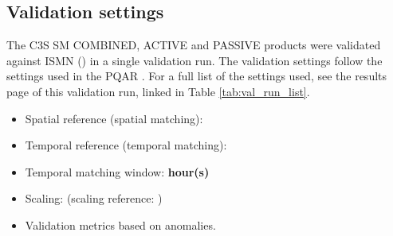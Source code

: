 \def\runidx{\detokenize{$<ContentVars['report_run_index']>$}}

\subsection{Validation settings} \label{ssec:settings}

The \ac{C3S} SM COMBINED, ACTIVE and PASSIVE products were validated against \ac{ISMN} () in a single validation run.
The validation settings follow the settings used in the \ac{PQAR} \citep{c3spqar}.
For a full list of the settings used, see the results page of this validation run, linked in Table \ref{tab:val_run_list}.

\begin{itemize}
    \item Spatial reference (spatial matching): \textbf{}
    \item Temporal reference (temporal matching): \textbf{}
    \item Temporal matching window: \textbf{ hour(s)}
    \item Scaling: \textbf{} (scaling reference: \textbf{})
    \item Validation metrics  based on anomalies.
\end{itemize}

